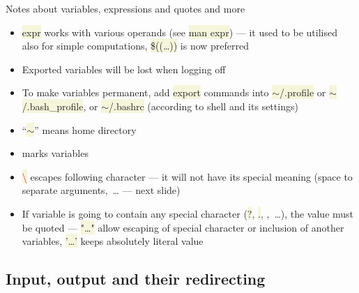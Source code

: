 \documentclass[compress, xelatex, 11pt, xcolor=svgnames, aspectratio=169,
	hyperref={
		bookmarks=true,
		unicode=true,
		colorlinks=true,
		pdftitle={Linux, command line and MetaCentrum},
		plainpages=false,
		pdfauthor={Vojtech Zeisek},
		pdfsubject={Course about use of Linux command line, writing shell scripts and using MetaCentrum of CESNET},
		pdfcreator={XeLaTeX},
		pdfkeywords={Linux, GNU, BASH, shell, command line, MetaCentrum},
		linkcolor=DarkRed, %
		anchorcolor=DarkBlue, %
		citecolor=Indigo, %
		filecolor=NavyBlue, %
		menucolor=DarkMagenta, %
		urlcolor=DarkBlue, %
		},
	url={hyphens, lowtilde} %
	]{beamer}
\renewcommand{\texttt}[1]{\colorbox{Beige}{{\ttfamily #1}}}
\renewcommand{\alert}[1]{\textcolor{red}{#1}}
\begin{document}
\begin{frame}{Notes about variables, expressions and quotes and more}
	\label{varquotes}
	\begin{itemize}
		\item \texttt{expr} works with various operands (see \texttt{man expr}) --- it used to be utilised also for simple computations, \texttt{\$((\ldots))} is now preferred
		\item Exported variables will be lost when logging off
		\item To make variables permanent, add \texttt{export} commands into \texttt{$\sim$/.profile} or \texttt{$\sim$/.bash\_profile}, or \texttt{$\sim$/.bashrc} (according to shell and its settings)
		\item \enquote{\texttt{$\sim$}} means home directory
		\item \alert{\texttt{\textdollar}} marks variables
		\item \alert{\texttt{\textbackslash}} escapes following character --- it will not have its special meaning (space to separate arguments,~\ldots{ }--- next slide)
		\item If variable is going to contain any special character (\texttt{?}, \texttt{.}, \texttt{*},~\ldots), the value must be quoted --- \texttt{"\ldots"} allow escaping of special character or inclusion of another variables, \texttt{'\ldots'} keeps absolutely literal value
	\end{itemize}
\end{frame}

%     

\subsection[Chaining]{Input, output and their redirecting}
\end{document}
